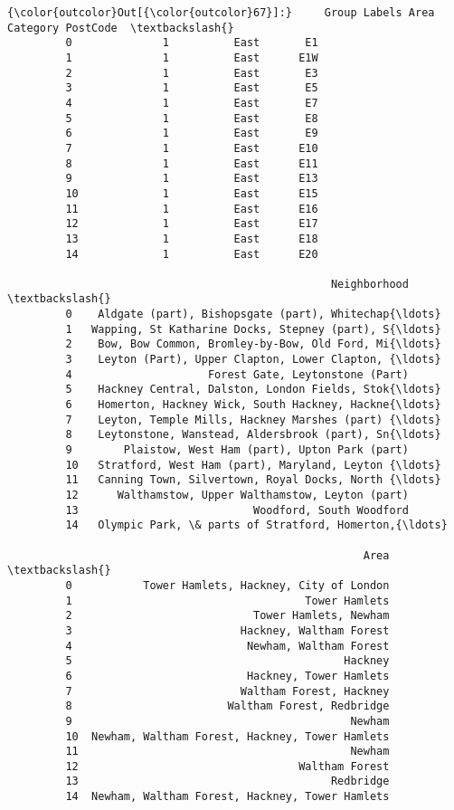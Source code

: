 \documentclass[11pt]{article}
\begin{document}
\begin{Verbatim}[commandchars=\\\{\}]
{\color{outcolor}Out[{\color{outcolor}67}]:}     Group Labels Area Category PostCode  \textbackslash{}
         0              1          East       E1   
         1              1          East      E1W   
         2              1          East       E3   
         3              1          East       E5   
         4              1          East       E7   
         5              1          East       E8   
         6              1          East       E9   
         7              1          East      E10   
         8              1          East      E11   
         9              1          East      E13   
         10             1          East      E15   
         11             1          East      E16   
         12             1          East      E17   
         13             1          East      E18   
         14             1          East      E20   
         
                                                  Neighborhood  \textbackslash{}
         0    Aldgate (part), Bishopsgate (part), Whitechap{\ldots}   
         1   Wapping, St Katharine Docks, Stepney (part), S{\ldots}   
         2    Bow, Bow Common, Bromley-by-Bow, Old Ford, Mi{\ldots}   
         3    Leyton (Part), Upper Clapton, Lower Clapton, {\ldots}   
         4                     Forest Gate, Leytonstone (Part)   
         5    Hackney Central, Dalston, London Fields, Stok{\ldots}   
         6    Homerton, Hackney Wick, South Hackney, Hackne{\ldots}   
         7    Leyton, Temple Mills, Hackney Marshes (part) {\ldots}   
         8    Leytonstone, Wanstead, Aldersbrook (part), Sn{\ldots}   
         9        Plaistow, West Ham (part), Upton Park (part)   
         10   Stratford, West Ham (part), Maryland, Leyton {\ldots}   
         11   Canning Town, Silvertown, Royal Docks, North {\ldots}   
         12      Walthamstow, Upper Walthamstow, Leyton (part)   
         13                           Woodford, South Woodford   
         14   Olympic Park, \& parts of Stratford, Homerton,{\ldots}   
         
                                                       Area  \textbackslash{}
         0           Tower Hamlets, Hackney, City of London   
         1                                    Tower Hamlets   
         2                            Tower Hamlets, Newham   
         3                          Hackney, Waltham Forest   
         4                           Newham, Waltham Forest   
         5                                          Hackney   
         6                           Hackney, Tower Hamlets   
         7                          Waltham Forest, Hackney   
         8                        Waltham Forest, Redbridge   
         9                                           Newham   
         10  Newham, Waltham Forest, Hackney, Tower Hamlets   
         11                                          Newham   
         12                                  Waltham Forest   
         13                                       Redbridge   
         14  Newham, Waltham Forest, Hackney, Tower Hamlets   
         

\end{Verbatim}
\end{document}
